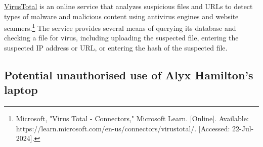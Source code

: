 \begin{myenum}
    \item \href{https://www.virustotal.com/gui/home/upload}{VirusTotal} is an online service that analyzes suspicious files and URLs to detect types of malware and malicious content using antivirus engines and website scanners.\footnote{Microsoft, "Virus Total - Connectors," Microsoft Learn. [Online]. Available: https://learn.microsoft.com/en-us/connectors/virustotal/. [Accessed: 22-Jul-2024].} The service provides several means of querying its database and checking a file for virus, including uploading the suspected file, entering the suspected IP address or URL, or entering the hash of the suspected file.
\end{myenum}

\subsection{Potential unauthorised use of Alyx Hamilton's laptop} %
\label{sub:Potential unauthorised use of Alyx Hamilton's laptop}
